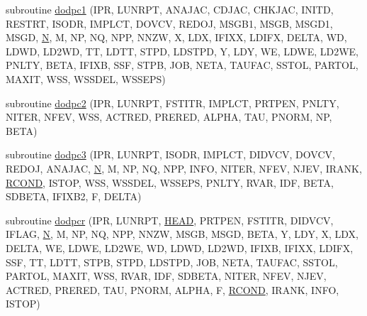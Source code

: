 \begin{DoxyCompactItemize}
\item 
subroutine \hyperlink{d__odr_8f_aa6a2207571a23b36dff6c649403352ed}{dodpc1} (I\+P\+R, L\+U\+N\+R\+P\+T, A\+N\+A\+J\+A\+C, C\+D\+J\+A\+C, C\+H\+K\+J\+A\+C, I\+N\+I\+T\+D, R\+E\+S\+T\+R\+T, I\+S\+O\+D\+R, I\+M\+P\+L\+C\+T, D\+O\+V\+C\+V, R\+E\+D\+O\+J, M\+S\+G\+B1, M\+S\+G\+B, M\+S\+G\+D1, M\+S\+G\+D, \hyperlink{polmisc_8c_a0240ac851181b84ac374872dc5434ee4}{N}, M, N\+P, N\+Q, N\+P\+P, N\+N\+Z\+W, X, L\+D\+X, I\+F\+I\+X\+X, L\+D\+I\+F\+X, D\+E\+L\+T\+A, W\+D, L\+D\+W\+D, L\+D2\+W\+D, T\+T, L\+D\+T\+T, S\+T\+P\+D, L\+D\+S\+T\+P\+D, Y, L\+D\+Y, W\+E, L\+D\+W\+E, L\+D2\+W\+E, P\+N\+L\+T\+Y, B\+E\+T\+A, I\+F\+I\+X\+B, S\+S\+F, S\+T\+P\+B, J\+O\+B, N\+E\+T\+A, T\+A\+U\+F\+A\+C, S\+S\+T\+O\+L, P\+A\+R\+T\+O\+L, M\+A\+X\+I\+T, W\+S\+S, W\+S\+S\+D\+E\+L, W\+S\+S\+E\+P\+S)
\item 
subroutine \hyperlink{d__odr_8f_ae9fe73f17d2723ba42ebeffb34cd0b5e}{dodpc2} (I\+P\+R, L\+U\+N\+R\+P\+T, F\+S\+T\+I\+T\+R, I\+M\+P\+L\+C\+T, P\+R\+T\+P\+E\+N, P\+N\+L\+T\+Y, N\+I\+T\+E\+R, N\+F\+E\+V, W\+S\+S, A\+C\+T\+R\+E\+D, P\+R\+E\+R\+E\+D, A\+L\+P\+H\+A, T\+A\+U, P\+N\+O\+R\+M, N\+P, B\+E\+T\+A)
\item 
subroutine \hyperlink{d__odr_8f_a87b71696b6e5a9398cac8625779464cd}{dodpc3} (I\+P\+R, L\+U\+N\+R\+P\+T, I\+S\+O\+D\+R, I\+M\+P\+L\+C\+T, D\+I\+D\+V\+C\+V, D\+O\+V\+C\+V, R\+E\+D\+O\+J, A\+N\+A\+J\+A\+C, \hyperlink{polmisc_8c_a0240ac851181b84ac374872dc5434ee4}{N}, M, N\+P, N\+Q, N\+P\+P, I\+N\+F\+O, N\+I\+T\+E\+R, N\+F\+E\+V, N\+J\+E\+V, I\+R\+A\+N\+K, \hyperlink{superlu__enum__consts_8h_af00a42ecad444bbda75cde1b64bd7e72a9b5c151728d8512307565994c89919d5}{R\+C\+O\+N\+D}, I\+S\+T\+O\+P, W\+S\+S, W\+S\+S\+D\+E\+L, W\+S\+S\+E\+P\+S, P\+N\+L\+T\+Y, R\+V\+A\+R, I\+D\+F, B\+E\+T\+A, S\+D\+B\+E\+T\+A, I\+F\+I\+X\+B2, F, D\+E\+L\+T\+A)
\item 
subroutine \hyperlink{d__odr_8f_a879f14219ac0b106e27f467703a93cc2}{dodpcr} (I\+P\+R, L\+U\+N\+R\+P\+T, \hyperlink{superlu__enum__consts_8h_a9c99a6c403d30f227aa91cf3b10f6aa4a0b0955668575b21eb0ab2272aef49f76}{H\+E\+A\+D}, P\+R\+T\+P\+E\+N, F\+S\+T\+I\+T\+R, D\+I\+D\+V\+C\+V, I\+F\+L\+A\+G, \hyperlink{polmisc_8c_a0240ac851181b84ac374872dc5434ee4}{N}, M, N\+P, N\+Q, N\+P\+P, N\+N\+Z\+W, M\+S\+G\+B, M\+S\+G\+D, B\+E\+T\+A, Y, L\+D\+Y, X, L\+D\+X, D\+E\+L\+T\+A, W\+E, L\+D\+W\+E, L\+D2\+W\+E, W\+D, L\+D\+W\+D, L\+D2\+W\+D, I\+F\+I\+X\+B, I\+F\+I\+X\+X, L\+D\+I\+F\+X, S\+S\+F, T\+T, L\+D\+T\+T, S\+T\+P\+B, S\+T\+P\+D, L\+D\+S\+T\+P\+D, J\+O\+B, N\+E\+T\+A, T\+A\+U\+F\+A\+C, S\+S\+T\+O\+L, P\+A\+R\+T\+O\+L, M\+A\+X\+I\+T, W\+S\+S, R\+V\+A\+R, I\+D\+F, S\+D\+B\+E\+T\+A, N\+I\+T\+E\+R, N\+F\+E\+V, N\+J\+E\+V, A\+C\+T\+R\+E\+D, P\+R\+E\+R\+E\+D, T\+A\+U, P\+N\+O\+R\+M, A\+L\+P\+H\+A, F, \hyperlink{superlu__enum__consts_8h_af00a42ecad444bbda75cde1b64bd7e72a9b5c151728d8512307565994c89919d5}{R\+C\+O\+N\+D}, I\+R\+A\+N\+K, I\+N\+F\+O, I\+S\+T\+O\+P)

\end{DoxyCompactItemize}
